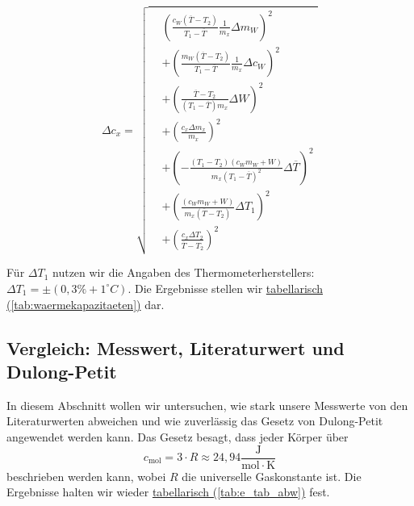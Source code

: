 \begin{equation}
    \Delta c_x = 
    \sqrt{ 
    \begin{aligned}
    &   \left( \frac{c_W ( \overline{T} - T_2)}{T_1 - \overline{T}} \frac{1}{m_x} \Delta m_W \right)^2 \\
    & + \left( \frac{m_W (\overline{T} - T_2)}{T_1 - \overline{T}} \frac{1}{m_x} \Delta c_W \right)^2 \\
    & + \left( \frac{\overline{T} - T_2}{(T_1 - \overline{T}) m_x} \Delta W \right)^2 \\
    & + \left( \frac{c_x \Delta m_x}{m_x} \right)^2 \\
    & + \left( - \frac{(T_1 - T_2)(c_W m_W + W)}{m_x (T_1 - \overline{T})^2} \Delta \overline{T} \right)^2 \\
    & + \left( \frac{(c_W m_W + W)}{m_x (\overline{T} - T_2)} \Delta T_1 \right)^2 \\
    & + \left( \frac{c_x \Delta T_2}{\overline{T} - T_2} \right)^2
    \end{aligned}
    }
    \label{eq:deltacx}
\end{equation}

Für $\Delta T_1$ nutzen wir die Angaben des Thermometerherstellers: $\Delta T_1 = \pm(0,3\% + 1^\circ C)$.
Die Ergebnisse stellen wir \hyperref[tab:waermekapazitaeten]{tabellarisch (\ref*{tab:waermekapazitaeten})} dar.

\subsection*{Vergleich: Messwert, Literaturwert und Dulong-Petit}
In diesem Abschnitt wollen wir untersuchen, wie stark unsere Messwerte von den Literaturwerten abweichen und wie zuverlässig das Gesetz von Dulong-Petit angewendet werden kann.
Das Gesetz besagt, dass jeder Körper über
\begin{equation}
    c_\mathrm{mol} = 3 \cdot R \approx 24,94 \frac{\mathrm{J}}{\mathrm{mol \cdot K}}
\end{equation}
beschrieben werden kann, wobei $R$ die universelle Gaskonstante ist. Die Ergebnisse halten wir wieder \hyperref[tab:e_tab_abw]{tabellarisch (\ref*{tab:e_tab_abw})} fest.

